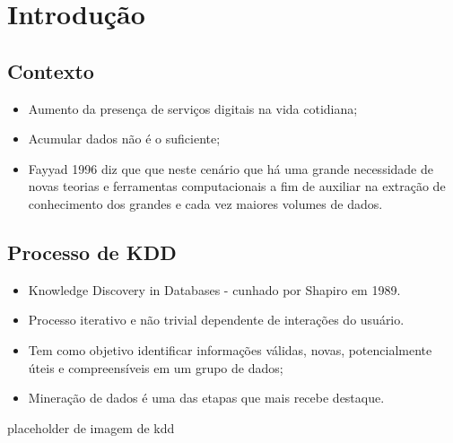 \section{Introdução}

\subsection{Contexto}
\begin{frame}
	\begin{itemize}
		\item Aumento da presença de serviços digitais na vida cotidiana;
		\item Acumular dados não é o suficiente;
		\item Fayyad 1996 \cite{fayyad1996} diz que que neste cenário que há uma grande necessidade de novas teorias e ferramentas computacionais a fim de auxiliar na extração de conhecimento dos grandes e cada vez maiores volumes de dados.
	\end{itemize}
\end{frame}

\subsection{Processo de KDD}

\begin{frame}
	\begin{itemize}
		\item Knowledge Discovery in Databases - cunhado por Shapiro em 1989.
		\item Processo iterativo e não trivial dependente de interações do usuário.
		\item Tem como objetivo identificar informações válidas, novas, potencialmente úteis e compreensíveis em um grupo de dados;
		\item Mineração de dados é uma das etapas que mais recebe destaque.
	\end{itemize}

placeholder de imagem de kdd
\end{frame}
